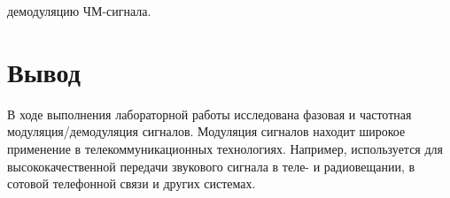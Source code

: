 \documentclass[a4paper,12pt]{article}
\begin{document}
\begin{enumerate}
{ демодуляцию ЧМ-сигнала.
\\}

\section{Вывод}

В ходе выполнения лабораторной работы исследована фазовая и частотная модуляция/демодуляция сигналов. Модуляция сигналов находит широкое применение в телекоммуникационных технологиях. Например, используется для высококачественной передачи звукового сигнала в теле- и радиовещании, в сотовой телефонной связи и других системах.

\end{enumerate}
\end{document}
